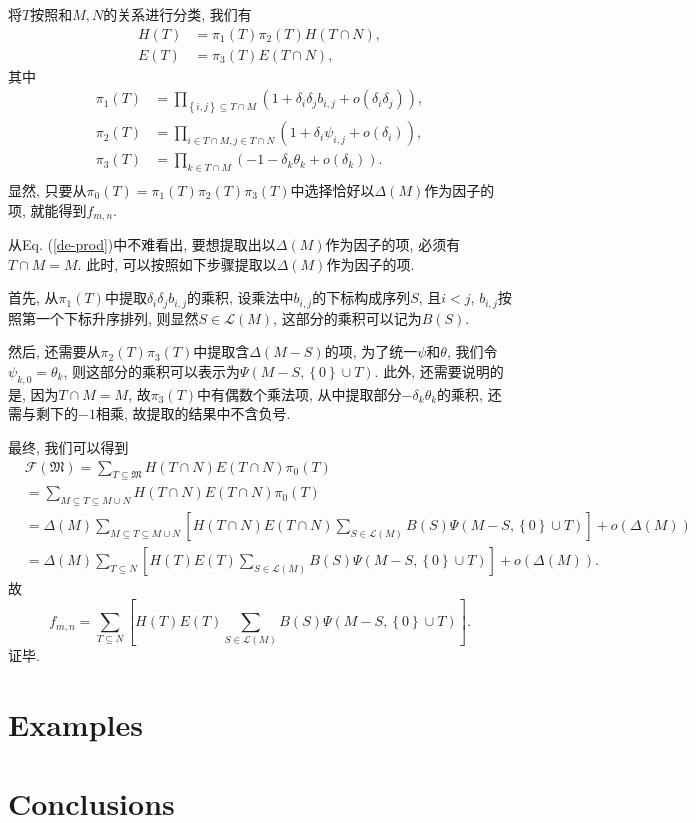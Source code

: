 \documentclass[12pt,a4paper,UTF8]{article}
\numberwithin{equation}{section}
\newcommand{\sbrace}[1]{\left(#1\right)}
\newcommand{\mbrace}[1]{\left[#1\right]}
\newcommand{\bbrace}[1]{\left\{#1\right\}}
\newcommand{\FM}{\mathfrak{M}}
\newcommand{\CF}{\mathcal{F}}
\newcommand{\refeqn}[1]{Eq. (\ref{#1})}
\begin{document}
将$T$按照和$M,N$的关系进行分类, 我们有
\begin{equation}
\begin{aligned}
  H(T)&=\pi_1(T)\pi_2(T)H(T\cap N), \\ 
  E(T)&=\pi_3(T)E(T\cap N),
\end{aligned}
\end{equation}
其中
\begin{equation}
\begin{aligned}
  \pi_1(T)&=\prod_{\bbrace{i,j}\subseteq T\cap M}\sbrace{1+\delta_i \delta_j b_{i,j}+o(\delta_i \delta_j)} ,\\
  \pi_2(T)&=\prod_{i\in T\cap M,j\in T\cap N}\sbrace{1+\delta_i \psi_{i,j}+o(\delta_i)} ,\\
  \pi_3(T)&=\prod_{k\in T\cap M}\sbrace{-1-\delta_k \theta_k+o(\delta_k)} .\\
\end{aligned}
\label{de-prod}
\end{equation}
显然, 只要从$\pi_0(T)=\pi_1(T)\pi_2(T)\pi_3(T)$中选择恰好以$\Delta(M)$作为因子的项, 就能得到$f_{m,n}$. 

从\refeqn{de-prod}中不难看出, 要想提取出以$\Delta(M)$作为因子的项, 必须有$T\cap M=M$. 此时, 可以按照如下步骤提取以$\Delta(M)$作为因子的项.

首先, 从$\pi_1(T)$中提取$\delta_i \delta_j b_{i,j}$的乘积, 设乘法中$b_{i,j}$的下标构成序列$S$, 且$i<j$, $b_{i,j}$按照第一个下标升序排列, 则显然$S\in \mathcal L(M)$, 这部分的乘积可以记为$B(S)$. 

然后, 还需要从$\pi_2(T)\pi_3(T)$中提取含$\Delta(M-S)$的项, 为了统一$\psi$和$\theta$, 我们令$\psi_{k,0}=\theta_k$, 则这部分的乘积可以表示为$\Psi(M-S,\bbrace{0}\cup T)$. 此外, 还需要说明的是, 因为$T\cap M=M$, 故$\pi_3(T)$中有偶数个乘法项, 从中提取部分$-\delta_k \theta_k$的乘积, 还需与剩下的$-1$相乘, 故提取的结果中不含负号. 

最终, 我们可以得到
\begin{equation}
\begin{aligned}
&\CF(\FM)=\sum_{T\subseteq \FM}{H(T\cap N)E(T\cap N)\pi_0(T)} \\ 
&=\sum_{M\subseteq T\subseteq M\cup N}{H(T\cap N)E(T\cap N)\pi_0(T)} \\
&=\Delta(M)\sum_{M\subseteq T\subseteq M\cup N}\mbrace{H(T\cap N)E(T\cap N)\sum_{S\in \mathcal L(M)}{B(S)\Psi(M-S,\bbrace{0}\cup T)}}+o(\Delta(M)) \\
&=\Delta(M)\sum_{T\subseteq N}\mbrace{H(T)E(T)\sum_{S\in \mathcal L(M)}{B(S)\Psi(M-S,\bbrace{0}\cup T)}}+o(\Delta(M)) .
\end{aligned}
\end{equation}
故
\begin{equation}
f_{m,n}=\sum_{T\subseteq N}\mbrace{H(T)E(T)\sum_{S\in \mathcal L(M)}{B(S)\Psi(M-S,\bbrace{0}\cup T)}}. 
\end{equation}
证毕. 

\section{Examples}\label{example}

\section{Conclusions}\label{conclusion}
\end{document}
